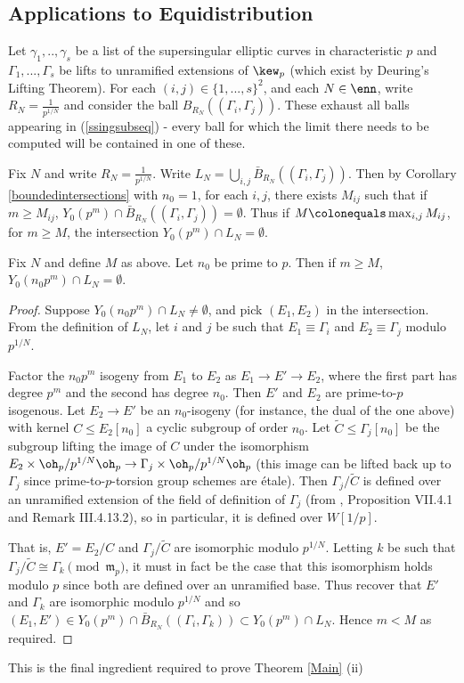 \documentclass[12pt,letterpaper]{article}
\begin{document}
	
	\subsection{Applications to Equidistribution}
	
	
	Let $\gamma_1,..,\gamma_s$ be a list of the supersingular elliptic curves in characteristic $p$ and $\Gamma_1,...,\Gamma_s$ be lifts to unramified extensions of $\kew_p$ (which exist by Deuring's Lifting Theorem). For each $(i,j) \in \{1,...,s\}^2$, and each $N\in \enn$, write $R_N =\frac{1}{p^{1/N}}$ and  consider the ball $B_{R_N}((\Gamma_i,\Gamma_j))$. These exhaust all balls appearing in (\ref{ssingsubseq}) - every ball for which the limit there needs to be computed will be contained in one of these.
	
	Fix $N$ and write $R_N = \frac{1}{p^{1/N}}$. Write $L_N = \bigcup_{i,j} \bar{B}_{R_N}((\Gamma_i,\Gamma_j))$. Then by Corollary \ref{boundedintersections} with $n_0=1$, for each $i,j$, there exists $M_{ij}$ such that if $m\geq M_{ij}$, $Y_0(p^m)\cap \bar{B}_{R_N}((\Gamma_i,\Gamma_j))=\emptyset$. Thus if $M \colonequals \max_{i,j}M_{ij}$, for $m\geq M$, the intersection $Y_0(p^m)\cap L_N =\emptyset$.
	
	
	\begin{lemma} \label{primetop}
		Fix $N$ and define $M$ as above. Let $n_0$ be prime to $p$. Then if $m\geq M$, $Y_0(n_0p^m)\cap L_N =\emptyset$.
	\end{lemma}
	
	\begin{proof}
		Suppose $Y_0(n_0p^m)\cap L_N \neq\emptyset$, and pick $(E_1,E_2)$ in the intersection. From the definition of $L_N$, let $i$ and $j$ be such that $E_1 \equiv \Gamma_i$ and $E_2 \equiv \Gamma_j$ modulo $p^{1/N}$. 
		
		Factor the $n_0p^m$ isogeny from $E_1$ to $E_2$ as $E_1 \to E'\to E_2$, where the first part has degree $p^m$ and the second has degree $n_0$. Then $E'$ and $E_2$ are prime-to-$p$ isogenous. Let $E_2\to E'$ be an $n_0$-isogeny (for instance, the dual of the one above) with kernel $C\leq E_2[n_0]$ a cyclic subgroup of order $n_0$. Let $\tilde{C}\leq \Gamma_j[n_0]$ be the subgroup lifting the image of $C$ under the isomorphism $E_2\times \oh_p/p^{1/N}\oh_p \to \Gamma_j \times \oh_p/p^{1/N}\oh_p$ (this image can be lifted back up to $\Gamma_j$ since prime-to-$p$-torsion group schemes are \'etale). Then $\Gamma_j/\tilde{C}$ is defined over an unramified extension of the field of definition of $\Gamma_j$ (from \cite{Sil86}, Proposition VII.4.1 and Remark III.4.13.2), so in particular, it is defined over $W[1/p]$. 
		
		That is, $E' = E_2/C$ and $\Gamma_j/\tilde{C}$ are isomorphic modulo $p^{1/N}$. Letting $k$ be such that $\Gamma_j/\tilde{C}\cong \Gamma_k \pmod{\mathfrak{m}_p}$, it must in fact be the case that this isomorphism holds modulo $p$ since both are defined over an unramified base. Thus recover that $E'$ and $\Gamma_k$ are isomorphic modulo $p^{1/N}$ and so $(E_1,E')\in Y_0(p^m)\cap \bar{B}_{R_N}((\Gamma_i,\Gamma_k))\subset Y_0(p^m)\cap L_N$. Hence $m< M$ as required.
	\end{proof}	
	This is the final ingredient required to prove Theorem \ref{Main} (ii)
	
\end{document}
